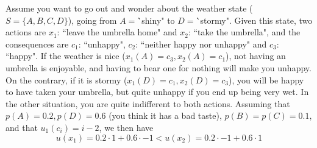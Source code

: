 \documentclass[french, english]{llncs}
\begin{document}
	\begin{example}\label{exm:DMU}
		Assume you want to go out and wonder about the weather state ($S=\{A,B,C,D\}$), going from $A=$\``shiny" to $D=$\``stormy". Given this state, two actions are $x_1$: ``leave the umbrella home" and $x_2$: ``take the umbrella", and the consequences are $c_1$: ``unhappy", $c_2$: ``neither happy nor unhappy" and $c_3$: ``happy". If the weather is nice ($x_1(A)=c_3,x_2(A)=c_1$), not having an umbrella is enjoyable,  and having to bear one for nothing will make you unhappy. On the contrary, if it is stormy ($x_1(D)=c_1,x_2(D)=c_3$), you will be happy to have taken your umbrella, but quite unhappy if you end up being very wet. In the other situation, you are quite indifferent to both actions. Assuming that $p(A)=0.2, p(D)=0.6$ (you think it has a bad taste), $p(B)=p(C)=0.1$, and that $u_1(c_i)=i-2$, we then have
		$$u(x_1)=0.2 \cdot 1 + 0.6 \cdot -1 <  u(x_2)=0.2 \cdot -1 + 0.6 \cdot 1$$
	\end{example}
	
\end{document}
